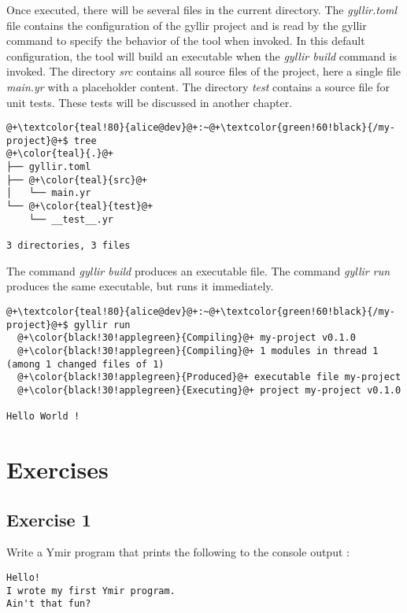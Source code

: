 Once executed, there will be several files in the current directory.
The \textit{gyllir.toml} file contains the configuration of the gyllir project
and is read by the gyllir command to specify the behavior of the tool when
invoked. In this default configuration, the tool will build an executable when
the \textit{gyllir build} command is invoked. The directory \textit{src}
contains all source files of the project, here a single file \textit{main.yr}
with a placeholder content. The directory \textit{test} contains a source file
for unit tests. These tests will be discussed in another chapter.

\begin{lstlisting}[style=bashVerb, escapechar=@+]
@+\textcolor{teal!80}{alice@dev}@+:~@+\textcolor{green!60!black}{/my-project}@+$ tree
@+\color{teal}{.}@+
├── gyllir.toml
├── @+\color{teal}{src}@+
│   └── main.yr
└── @+\color{teal}{test}@+
    └── __test__.yr

3 directories, 3 files
\end{lstlisting}

The command \textit{gyllir build} produces an executable file. The
command \textit{gyllir run} produces the same executable, but runs it
immediately.

\begin{lstlisting}[style=bashVerb, escapechar=@+]
@+\textcolor{teal!80}{alice@dev}@+:~@+\textcolor{green!60!black}{/my-project}@+$ gyllir run
  @+\color{black!30!applegreen}{Compiling}@+ my-project v0.1.0
  @+\color{black!30!applegreen}{Compiling}@+ 1 modules in thread 1 (among 1 changed files of 1)
  @+\color{black!30!applegreen}{Produced}@+ executable file my-project
  @+\color{black!30!applegreen}{Executing}@+ project my-project v0.1.0

Hello World !
\end{lstlisting}

\section{Exercises}
\subsection{Exercise 1}

Write a Ymir program that prints the following to the console output :
\begin{verbatim}
Hello!
I wrote my first Ymir program.
Ain't that fun?
\end{verbatim}

